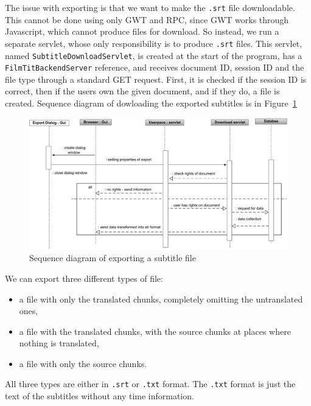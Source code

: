 

The issue with exporting is that we want to make the {\tt .srt} file downloadable. This cannot be done using only GWT and RPC, since GWT works through Javascript, which cannot produce files for download. So instead, we run a separate servlet, whose only responsibility is to produce {\tt .srt} files. This servlet, named \texttt{SubtitleDownloadServlet}, is created at the start of the program, has a \texttt{FilmTitBackendServer} reference, and receives document ID, session ID and the file type through a standard GET request. First, it is checked if the session ID is correct, then if the users own the given document, and if they do, a file is created. Sequence diagram of  dowloading the exported subtitles is in Figure~\ref{fig:export_diagram}

\begin{figure}[h]
\begin{center}
\includegraphics[scale=0.6]{figures/download_diagram.pdf}
\end{center}
\caption{Sequence diagram of exporting a subtitle file}
\label{fig:export_diagram}
\end{figure}

We can export three different types of file:
\begin{itemize}
    \item a file with only the translated chunks, completely omitting the untranslated ones,
    \item a file with the translated chunks, with the source chunks at places where nothing is translated,
    \item a file with only the source chunks.
\end{itemize}

All three types are either in {\tt .srt} or {\tt .txt} format. The {\tt .txt} format is just the text of the subtitles without any time information.